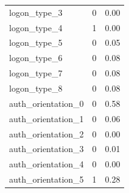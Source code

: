\begin{table}[htbp]
\begin{tabular}{lll}
		logon\_type\_3 & 0 & 0.00 \\
		logon\_type\_4 & 1 & 0.00 \\
		logon\_type\_5 & 0 & 0.05 \\
		logon\_type\_6 & 0 & 0.08 \\
		logon\_type\_7 & 0 & 0.08 \\
		logon\_type\_8 & 0 & 0.08 \\
		auth\_orientation\_0 & 0 & 0.58 \\
		auth\_orientation\_1 & 0 & 0.06 \\
		auth\_orientation\_2 & 0 & 0.00 \\
		auth\_orientation\_3 & 0 & 0.01 \\
		auth\_orientation\_4 & 0 & 0.00 \\
		auth\_orientation\_5 & 1 & 0.28
	\end{tabular}
\end{table}

